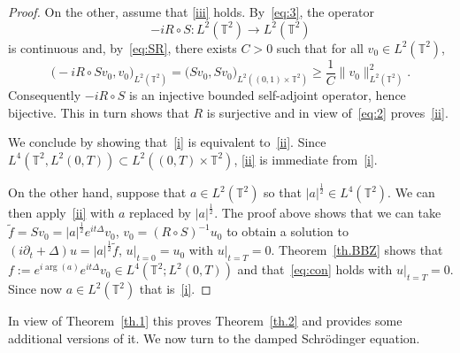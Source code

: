 \documentclass[AHL, Unicode, longabstracts]{cedram}
\newcommand{\TT}{{\mathbb T}}
\newcommand{\TT}{{\mathbb T}}
\begin{document}
\begin{proof}
On the other, assume that {\eqref{iii}} holds. By~\eqref{eq:3}, the operator
\[
-i R \circ S : L^2(\TT^2) \rightarrow L^2(\TT^2)
\]
is continuous and,
by~\eqref{eq:SR}, there exists $ C > 0 $ such that for all $ v_0 \in L^2(\TT^2) $,
\[
\bigl(-i R \circ S v_0, v_0 \bigr) _{L^2(\TT^2)} = \bigl(Sv_0, S v_0\bigr)_{L^2((0,1) \times \TT^2) } \geq \frac 1 C \| v_0 \|_{L^2(\TT^2)}^2.
\]
Consequently $ -i R \circ S $ is an injective bounded self-adjoint operator, hence bijective. This in turn shows that $R$ is surjective and in view of~\eqref{eq:2} proves~\eqref{ii}.

We conclude by showing that~\eqref{i} is equivalent to~\eqref{ii}. Since $ L^4 (\TT^2, L^2 (0, T)) \subset L^2 ((0, T) \times
\TT^2)$, \eqref{ii} is immediate from~\eqref{i}.

On the other hand, suppose that $ a \in L^2 (\TT^2) $ so that $ |a|^{\frac12} \in L^4 (\TT^2) $. We can then apply~\eqref{ii} with $ a $ replaced by $ |a|^{\frac12 } $. The proof above shows that we can take $ \tilde f = Sv_0 = |a|^{\frac12} e^{it \Delta} v_0$, $ v_0 = (R \circ S)^{-1} u_0 $ to obtain a solution to $ (i \partial_t + \Delta) u = |a|^{\frac12} \tilde f $, $ u|_{t=0} = u_0 $ with $ u |_{t=T}=0 $. Theorem~\ref{th.BBZ} shows that $ f := e^{ i \arg(a)} e^{it \Delta} v_0 \in L^4(\TT^2; L^2(0,T)) $ and that~\eqref{eq:con} holds with $ u |_{t=T}=0 $. Since now $ a \in L^2 (\TT^2) $ that is~\eqref{i}.
\end{proof}

In view of Theorem~\ref{th.1} this proves Theorem~\ref{th.2} and provides some additional versions of it. We now turn to the damped Schrödinger equation.
\end{document}
